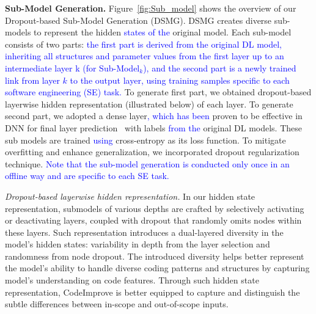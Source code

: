 \textbf{Sub-Model Generation.} 
Figure~\ref{fig:Sub_model} shows the overview of our Dropout-based Sub-Model Generation (DSMG). 
DSMG creates diverse sub-models to represent the hidden \textcolor{blue}{states of the} original model.
Each sub-model consists of two parts: \textcolor{blue}{the first part is derived from the original DL model, inheriting all structures and parameter values from the first layer up to an intermediate layer k (for Sub-Model$_k$), and the second part is a newly trained link from layer 
$k$ to the output layer, using training samples specific to each software engineering (SE) task.}
 To generate first part, we obtained dropout-based layerwise hidden representation (illustrated below) of each layer. To generate second part, we adopted a dense layer\textcolor{blue}{, which has been} proven to be effective in DNN for final layer prediction~\cite{huang2017densely,he2016deep} with labels \textcolor{blue}{from the} original DL models. These sub models are trained \textcolor{blue}{using} cross-entropy as its loss function. To mitigate overfitting and enhance generalization, we incorporated dropout regularization technique. \textcolor{blue}{Note that the sub-model generation is conducted only
once in an offline way and are specific to each SE task.}


\textit{Dropout-based layerwise hidden representation.}
In our hidden state representation, submodels of various depths are crafted by selectively activating or deactivating layers, coupled with dropout that randomly omits nodes within these layers. Such representation introduces a dual-layered diversity in the model's hidden states: variability in depth from the layer selection and randomness from node dropout. The introduced diversity helps better represent the model's ability to handle diverse coding patterns and structures by capturing model's understanding on code features. Through such hidden state representation, CodeImprove is better equipped to capture and distinguish the subtle differences between in-scope and out-of-scope inputs.



